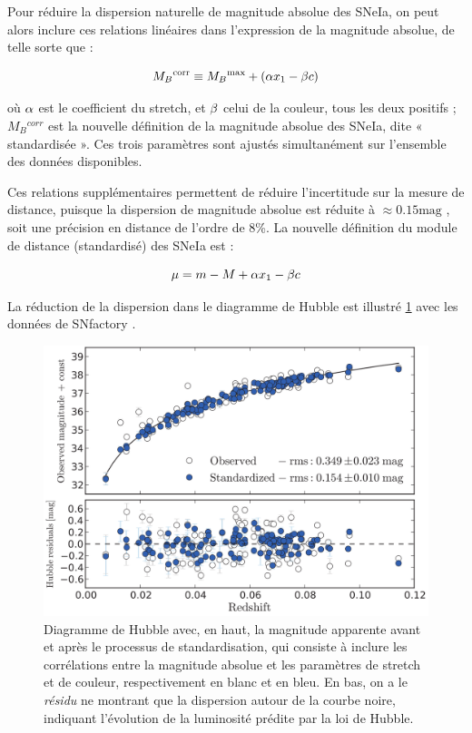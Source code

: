 \documentclass[a4paper, 12pt, svgnames]{article}
\begin{document}
Pour réduire la dispersion naturelle de magnitude absolue des SNeIa, on peut
alors inclure ces relations linéaires dans l'expression de la magnitude absolue,
de telle sorte que :

\begin{equation}
    M_B{}^{\text{corr}} \equiv M_B{}^{\text{max}} + \left(\alpha x_1 - \beta c\right)
\end{equation}

où $\alpha$ est le coefficient du stretch, et $\beta$ celui de la couleur, tous les
deux positifs ; $M_B{}^{corr}$ est la nouvelle définition de la magnitude
absolue des SNeIa, dite « standardisée ». Ces trois paramètres sont ajustés
simultanément sur l'ensemble des données disponibles.

Ces relations supplémentaires permettent de réduire l'incertitude sur la
mesure de distance, puisque la dispersion de magnitude absolue est réduite à
$\approx 0.15 \mathrm{mag}$ \cite{betoule_improved_2014}, soit une précision en
distance de l'ordre de 8\%. La nouvelle définition du module de distance
(standardisé) des SNeIa est :

\begin{equation}
    \mu = m - M +\alpha x_1 - \beta c
\end{equation}

La réduction de la dispersion dans le diagramme de Hubble est illustré
\ref{disp_20} avec les données de SNfactory \cite{rigault_strong_2018}.

\begin{figure}[htbp!]
    \centering
    \includegraphics[width=.5\linewidth]{Rapport_figures/disp_beau.png}
    \captionsetup{justification=centering}
    \caption{Diagramme de Hubble avec, en haut, la magnitude apparente avant et
        après le processus de standardisation, qui consiste à inclure les
        corrélations entre la magnitude absolue et les paramètres de stretch et
        de couleur, respectivement en blanc et en bleu. En bas, on a le
        \textit{résidu} ne montrant que la dispersion autour de la courbe noire,
        indiquant l'évolution de la luminosité prédite par la loi de Hubble.}
    \label{disp_20}
\end{figure}
\end{document}
